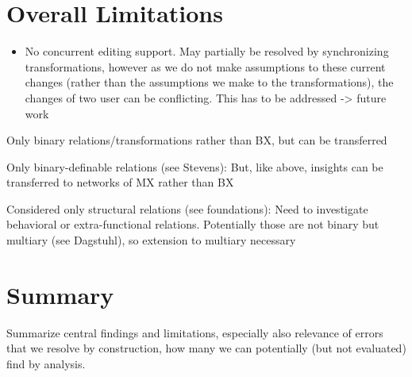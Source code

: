 \section{Overall Limitations}

\begin{itemize}
    \item No concurrent editing support. May partially be resolved by synchronizing transformations, however as we do not make assumptions to these current changes (rather than the assumptions we make to the transformations), the changes of two user can be conflicting. This has to be addressed -> future work
\end{itemize}

Only binary relations/transformations rather than BX, but can be transferred

Only binary-definable relations (see Stevens): But, like above, insights can be transferred to networks of MX rather than BX

Considered only structural relations (see foundations): Need to investigate behavioral or extra-functional relations. Potentially those are not binary but multiary (see Dagstuhl), so extension to multiary necessary



\section{Summary}

Summarize central findings and limitations, especially also relevance of errors that we resolve by construction, how many we can potentially (but not evaluated) find by analysis.


